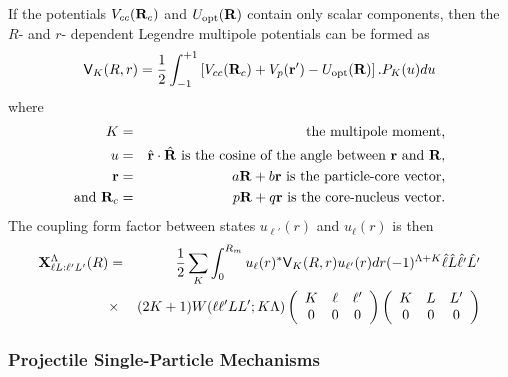 \documentclass[11pt,a4paper]{article}
\newcommand{\vecr}{{\bf r}}
\newcommand{\vecR}{{\bf R}}
\newcommand{\Vee}{{\sf V}}
\newcommand{\half}{\frac{1}{2}}
\begin{document}
If the potentials $V_{cc} (\vecR_c)$ and $U_{\rm opt} (\vecR)$
contain only scalar components, then
the $R$- and $r$- dependent Legendre multipole potentials
can be formed as
\begin{eqnarray}
  \Vee_K (R,r) =\half \int_{-1}^{+1}
    \left [ V_{cc} (\vecR_c) + V_p (\vecr') - U_{\rm opt} (\vecR) \right ]
      . P_K (u) du
\end{eqnarray}
where
\begin{eqnarray} \nonumber
  K &=& \mbox{ the multipole moment,}
\nonumber
\\
  u &=& \hat\vecr \cdot \hat\vecR
            \mbox{ is the cosine of the angle between } \vecr \mbox{ and } \vecR ,
\nonumber
\\
  \vecr &=& a \vecR + b \vecr \mbox{ is the particle-core vector,}
\nonumber
\\
  \mbox{and } \vecR_c &=& p \vecR + q \vecr \mbox{ is the core-nucleus vector.}
\nonumber
\end{eqnarray}
The coupling form factor between states $u_{\ell'} (r) $
and $u_\ell (r) $ is then
\begin{eqnarray} \nonumber
 \BX^\Lambda_{\ell L: \ell' L'} (R)
     &=&\half \sum _ K
     { \int_ 0^ {R_m} u_\ell (r)^*
                \Vee_K (R,r) u_{\ell'} (r) dr}
                (-1)^{\Lambda+K} \hat\ell \hat L \hat {\ell'} \hat {L'}\\
 &\times&
       (2K+1) W(\ell \ell' L L' ;K \Lambda)
        \left ( \begin{array}{ccc}K &\ell& \ell'\\0&0&0 \end{array} \right )
        \left ( \begin{array}{ccc}K&L&L'\\0&0&0 \end{array} \right )
\end{eqnarray}
\subsubsection{Projectile Single-Particle Mechanisms}
\end{document}
